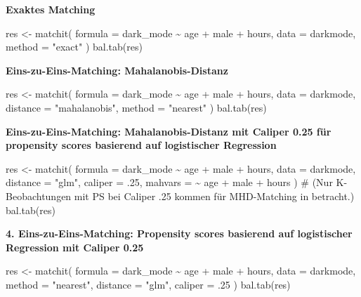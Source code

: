 \documentclass[
  a4paper,
  DIV=11,
  oneside]{scrreprt}
\newenvironment{Shaded}{\begin{snugshade}}{\end{snugshade}}
\newcommand{\NormalTok}[1]{\textcolor[rgb]{0.00,0.23,0.31}{#1}}
\begin{document}
\textbf{Exaktes Matching}

\begin{Shaded}
\begin{Highlighting}[]
\NormalTok{res \textless{}{-} matchit(}
\NormalTok{  formula = dark\_mode \textasciitilde{} age + male + hours, }
\NormalTok{  data = darkmode, }
\NormalTok{  method = "exact"}
\NormalTok{)}
\NormalTok{bal.tab(res)}
\end{Highlighting}
\end{Shaded}

\textbf{Eins-zu-Eins-Matching: Mahalanobis-Distanz}

\begin{Shaded}
\begin{Highlighting}[]
\NormalTok{res \textless{}{-} matchit(}
\NormalTok{  formula = dark\_mode \textasciitilde{} age + male + hours, }
\NormalTok{  data = darkmode, }
\NormalTok{  distance = "mahalanobis", }
\NormalTok{  method = "nearest"}
\NormalTok{)}
\NormalTok{bal.tab(res)}
\end{Highlighting}
\end{Shaded}

\textbf{Eins-zu-Eins-Matching: Mahalanobis-Distanz mit Caliper 0.25 für
propensity scores basierend auf logistischer Regression}

\begin{Shaded}
\begin{Highlighting}[]
\NormalTok{res \textless{}{-} matchit(}
\NormalTok{  formula = dark\_mode \textasciitilde{} age + male + hours, }
\NormalTok{  data = darkmode, }
\NormalTok{  distance = "glm", }
\NormalTok{  caliper = .25,}
\NormalTok{  mahvars = \textasciitilde{} age + male + hours}
\NormalTok{)}
\NormalTok{\# (Nur K{-}Beobachtungen mit PS bei Caliper .25 kommen für MHD{-}Matching in betracht.)}
\NormalTok{bal.tab(res)}
\end{Highlighting}
\end{Shaded}

\textbf{4. Eins-zu-Eins-Matching: Propensity scores basierend auf
logistischer Regression mit Caliper 0.25}

\begin{Shaded}
\begin{Highlighting}[]
\NormalTok{res \textless{}{-} matchit(}
\NormalTok{  formula = dark\_mode \textasciitilde{} age + male + hours, }
\NormalTok{  data = darkmode, }
\NormalTok{  method = "nearest", }
\NormalTok{  distance = "glm", }
\NormalTok{  caliper = .25}
\NormalTok{)}
\NormalTok{bal.tab(res)}
\end{Highlighting}
\end{Shaded}
\end{document}
